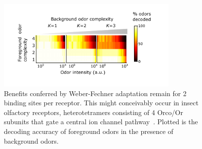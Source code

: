 \documentclass[10pt,prl,aps,showpacs,twocolumn,unsortedaddress,showkeys,linenumbers]{revtex4-1}
\begin{document}
\renewcommand\thefigure{\ref{fig:decoding}--figure supplement 3}  


\begin{figure}
\centering
\includegraphics[width=0.8\textwidth]{figures/2_binding_sites}
\caption{Benefits conferred by Weber-Fechner adaptation remain for 2 binding sites per receptor. This might conceivably occur in insect olfactory receptors, heterotetramers consisting of 4 Orco/Or subunits that gate a central ion channel pathway~\cite{orco_structure}. Plotted is the decoding accuracy of foreground odors in the presence of background odors.
}
\label{fig:SI_mult_binding}
\end{figure}


\renewcommand\thefigure{\ref{fig:decoding}--figure supplement 4}  
\end{document}
